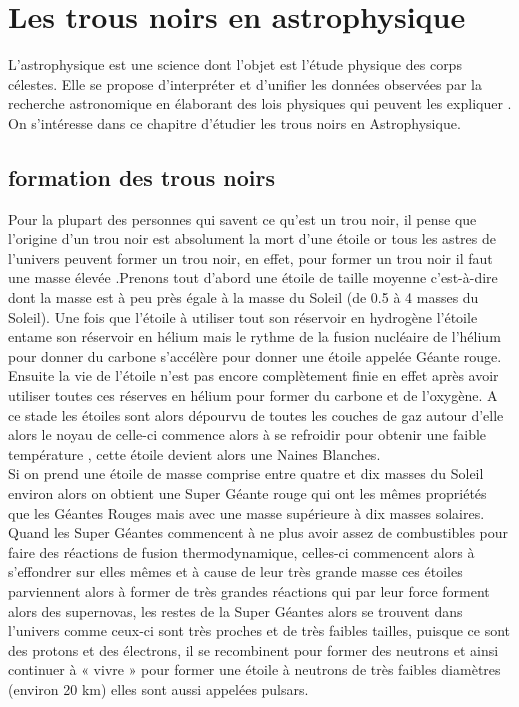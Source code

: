\documentclass[12pt,  a4paper, openright]{report} %
\begin{document}
	
	
	
	\chapter{Les trous noirs en astrophysique}
	L’astrophysique est une science dont l’objet est l’étude physique des corps célestes. Elle
se propose d’interpréter et d’unifier les données observées par la recherche astronomique
en élaborant des lois physiques qui peuvent les expliquer \cite{2}. On s’intéresse dans ce
chapitre d’étudier les trous noirs en Astrophysique.
	\section{formation des trous noirs}
	Pour la plupart des personnes qui savent ce qu’est un trou noir, il pense que l’origine d’un trou noir est absolument la mort d’une étoile or tous les astres de l’univers peuvent former un trou noir, en effet, pour former un trou noir il faut une masse élevée .Prenons tout d’abord une étoile de taille moyenne c'est-à-dire dont la masse est à peu près égale à la masse du Soleil (de 0.5 à 4 masses du Soleil). Une fois que l’étoile à utiliser tout son réservoir en hydrogène l’étoile entame son réservoir en hélium mais le rythme de la fusion nucléaire de l’hélium pour donner du carbone s’accélère pour donner une étoile appelée Géante rouge.  Ensuite la vie de l’étoile n’est pas encore complètement finie en effet après avoir utiliser toutes ces réserves en hélium pour former du carbone et de l’oxygène. A ce stade les étoiles sont alors dépourvu de toutes les couches de gaz autour d’elle alors le noyau de celle-ci commence alors à se refroidir pour obtenir une faible température , cette étoile devient alors une Naines Blanches.\\ 
	Si on prend une étoile de masse comprise entre quatre et dix masses du Soleil environ alors on obtient une Super Géante rouge qui ont les mêmes propriétés que les Géantes Rouges mais avec une masse supérieure à dix masses solaires. Quand les Super Géantes commencent à ne plus avoir assez de combustibles pour faire des réactions de fusion thermodynamique, celles-ci commencent alors à s’effondrer sur elles mêmes et à cause de leur très grande masse ces étoiles parviennent alors à former de très grandes réactions qui par leur force forment alors des supernovas, les restes de la Super Géantes alors se trouvent dans l’univers comme ceux-ci sont très proches et de très faibles tailles, puisque ce sont des protons et des électrons, il se recombinent pour former des neutrons et ainsi continuer à « vivre » pour former une étoile à neutrons de très faibles diamètres (environ 20 km) elles sont aussi appelées pulsars.\\
\end{document}
